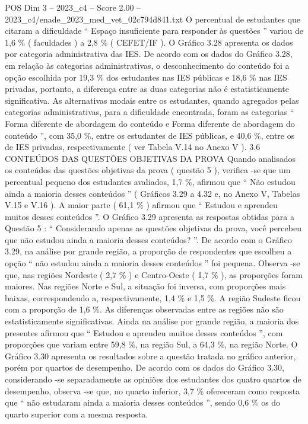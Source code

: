 \begin{textsample}{POS Dim 3 – 2023\_c4 – Score 2.00 – 2023\_c4/enade\_2023\_med\_vet\_02c794d841.txt}
O percentual de estudantes que citaram a dificuldade “ Espaço insuficiente para responder às questões ” variou de 1,6 \% ( faculdades ) a 2,8 \% ( CEFET/IF ).
O Gráfico 3.28 apresenta os dados por categoria administrativa das IES.
De acordo com os dados do Gráfico 3.28, em relação às categorias administrativas, o desconhecimento do conteúdo foi a opção escolhida por 19,3 \% dos estudantes nas IES públicas e 18,6 \% nas IES privadas, portanto, a diferença entre as duas categorias não é estatisticamente significativa.
As alternativas modais entre os estudantes, quando agregados pelas categorias administrativas, para a dificuldade encontrada, foram as categorias “ Forma diferente de abordagem do conteúdo e Forma diferente de abordagem do conteúdo ”, com 35,0 \%, entre os estudantes de IES públicas, e 40,6 \%, entre os de IES privadas, respectivamente ( ver Tabela V.14 no Anexo V ). 3.6 CONTEÚDOS DAS QUESTÕES OBJETIVAS DA PROVA Quando analisados os conteúdos das questões objetivas da prova ( questão 5 ), verifica -se que um percentual pequeno dos estudantes avaliados, 1,7 \%, afirmou que “ Não estudou ainda a maioria desses conteúdos ” ( Gráficos 3.29 a 4.32 e, no Anexo V, Tabelas V.15 e V.16 ).
A maior parte ( 61,1 \% ) afirmou que “ Estudou e aprendeu muitos desses conteúdos ”.
O Gráfico 3.29 apresenta as respostas obtidas para a Questão 5 : “ Considerando apenas as questões objetivas da prova, você percebeu que não estudou ainda a maioria desses conteúdos? ”.
De acordo com o Gráfico 3.29, na análise por grande região, a proporção de respondentes que escolheu a opção “ não estudou ainda a maioria desses conteúdos ” foi pequena.
Observa -se que, nas regiões Nordeste ( 2,7 \% ) e Centro-Oeste ( 1,7 \% ), as proporções foram maiores.
Nas regiões Norte e Sul, a situação foi inversa, com proporções mais baixas, correspondendo a, respectivamente, 1,4 \% e 1,5 \%.
A região Sudeste ficou com a proporção de 1,6 \%.
As diferenças observadas entre as regiões não são estatisticamente significativas.
Ainda na análise por grande região, a maioria dos presentes afirmou que “ Estudou e aprendeu muitos desses conteúdos ”, com proporções que variam entre 59,8 \%, na região Sul, a 64,3 \%, na região Norte.
O Gráfico 3.30 apresenta os resultados sobre a questão tratada no gráfico anterior, porém por quartos de desempenho.
De acordo com os dados do Gráfico 3.30, considerando -se separadamente as opiniões dos estudantes dos quatro quartos de desempenho, observa -se que, no quarto inferior, 3,7 \% ofereceram como resposta que “ não estudaram ainda a maioria desses conteúdos ”, sendo 0,6 \% os do quarto superior com a mesma resposta.

\end{textsample}
